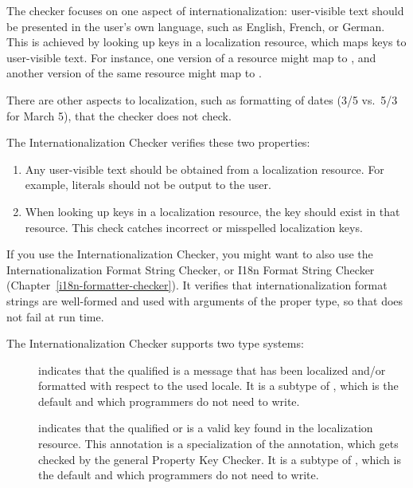 The checker focuses on one aspect of internationalization:  user-visible text
should be presented in the user's own language, such as English, French, or
German.  This is achieved by looking up keys in a localization resource,
which maps keys to user-visible text.  For instance, one version of a
resource might map  to
, and another version of the same resource might map
 to .

There are other aspects to localization, such as formatting of dates (3/5
vs.~5/3 for March 5), that the checker does not check.

The Internationalization Checker verifies these two properties:

\begin{enumerate}

\item
  Any user-visible text should be obtained from a localization resource.
  For example,  literals should not be output to the user.

\item
  When looking up keys in a localization resource, the key should exist in
  that resource.  This check catches incorrect or misspelled localization
  keys.

\end{enumerate}

If you use the Internationalization Checker, you might want to also use the
Internationalization Format String Checker, or I18n Format String Checker
(Chapter~\ref{i18n-formatter-checker}).
It verifies that internationalization format strings are well-formed and
used with arguments of the proper type, so that
does not fail at run time.


The Internationalization Checker supports two type systems:

\begin{description}
\item[]
indicates that the qualified
 is a message that has been localized and/or formatted with
respect to the used locale.
It is a subtype of ,
which is the default and which programmers do not need to write.

\item[]
indicates that the
qualified  or  is a valid key found in the
localization resource.
This annotation is a specialization of the  annotation, which
gets checked by the general Property Key Checker.
It is a subtype of ,
which is the default and which programmers do not need to write.
\end{description}

